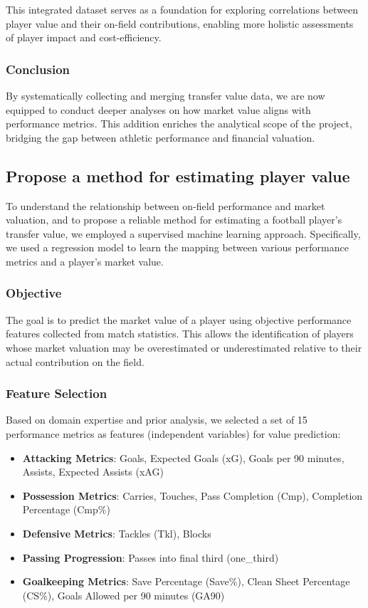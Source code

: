 \documentclass[a4paper,12pt]{article}
\begin{document}
This integrated dataset serves as a foundation for exploring correlations between player value and their on-field contributions, enabling more holistic assessments of player impact and cost-efficiency.

\subsubsection{Conclusion}

By systematically collecting and merging transfer value data, we are now equipped to conduct deeper analyses on how market value aligns with performance metrics. This addition enriches the analytical scope of the project, bridging the gap between athletic performance and financial valuation.

\subsection{Propose a method for estimating player value}

To understand the relationship between on-field performance and market valuation, and to propose a reliable method for estimating a football player's transfer value, we employed a supervised machine learning approach. Specifically, we used a regression model to learn the mapping between various performance metrics and a player's market value.

\subsubsection{Objective}

The goal is to predict the market value of a player using objective performance features collected from match statistics. This allows the identification of players whose market valuation may be overestimated or underestimated relative to their actual contribution on the field.

\subsubsection{Feature Selection}

Based on domain expertise and prior analysis, we selected a set of 15 performance metrics as features (independent variables) for value prediction:

\begin{itemize}
    \item \textbf{Attacking Metrics}: Goals, Expected Goals (xG), Goals per 90 minutes, Assists, Expected Assists (xAG)
    \item \textbf{Possession Metrics}: Carries, Touches, Pass Completion (Cmp), Completion Percentage (Cmp\%)
    \item \textbf{Defensive Metrics}: Tackles (Tkl), Blocks
    \item \textbf{Passing Progression}: Passes into final third (one\_third)
    \item \textbf{Goalkeeping Metrics}: Save Percentage (Save\%), Clean Sheet Percentage (CS\%), Goals Allowed per 90 minutes (GA90)
\end{itemize}
\end{document}
